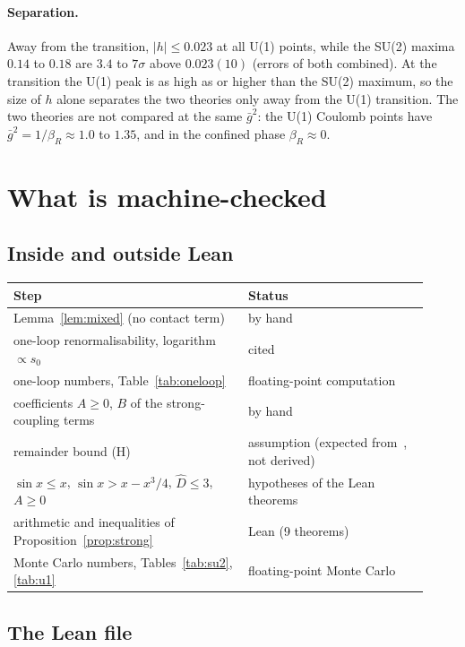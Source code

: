 \documentclass[11pt,a4paper]{article}
\theoremstyle{definition}
\theoremstyle{remark}
\newcommand{\gb}{\bar g^{2}}
\newcommand{\bR}{\beta_R}
\begin{document}
\paragraph{Separation.} Away from the transition, $|h|\le0.023$ at all U(1) points, while the SU(2) maxima $0.14$ to $0.18$ are $3.4$ to $7\sigma$ above $0.023(10)$ (errors of both combined). At the transition the U(1) peak is as high as or higher than the SU(2) maximum, so the size of $h$ alone separates the two theories only away from the U(1) transition. The two theories are not compared at the same $\gb$: the U(1) Coulomb points have $\gb=1/\bR\approx1.0$ to $1.35$, and in the confined phase $\bR\approx0$.

\section{What is machine-checked}\label{sec:lean}

\subsection{Inside and outside Lean}

\begin{center}\small
\begin{tabular}{@{}p{0.52\linewidth}p{0.40\linewidth}@{}}\toprule
Step & Status\\\midrule
Lemma~\ref{lem:mixed} (no contact term) & by hand\\
one-loop renormalisability, logarithm $\propto s_0$ & cited~\cite{LNWW}\\
one-loop numbers, Table~\ref{tab:oneloop} & floating-point computation\\
coefficients $A\ge0$, $B$ of the strong-coupling terms & by hand\\
remainder bound (H) & assumption (expected from~\cite{OS}, not derived)\\
$\sin x\le x$, $\sin x>x-x^3/4$, $\hat D\le3$, $A\ge0$ & hypotheses of the Lean theorems\\
arithmetic and inequalities of Proposition~\ref{prop:strong} & Lean (9 theorems)\\
Monte Carlo numbers, Tables~\ref{tab:su2}, \ref{tab:u1} & floating-point Monte Carlo\\\bottomrule
\end{tabular}
\end{center}

\subsection{The Lean file}
\end{document}
